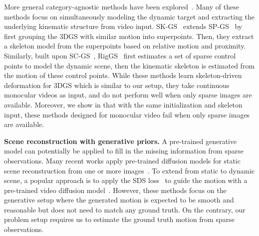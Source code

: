 More general category-agnostic methods have been explored~\cite{noguchi2022watch, yang2022banmo, zhang2024bags, wan2024template, yao2025riggs}. Many of these methods focus on simultaneously modeling the dynamic target and extracting the underlying kinematic structure from video input. 
SK-GS~\cite{wan2024template} extends SP-GS~\cite{wan2024superpoint} by first grouping the 3DGS with similar motion into superpoints. Then, they extract a skeleton model from the superpoints based on relative motion and proximity.
Similarly, built upon SC-GS~\cite{huang2024sc}, RigGS~\cite{yao2025riggs} first estimates a set of sparse control points to model the dynamic scene, then the kinematic skeleton is estimated from the motion of these control points. While these methods learn skeleton-driven deformation for 3DGS which is similar to our setup, they take continuous monocular videos as input, and do not perform well when only sparse images are available. Moreover, we show in  that with the same initialization and skeleton input, these methods designed for monocular video fail when only sparse images are available. 


\par
\vspace{6pt}
\noindent\textbf{Scene reconstruction with generative priors.}
A pre-trained generative model can potentially be applied to fill in the missing information from sparse observations.
Many recent works apply pre-trained diffusion models for static scene reconstruction from one or more images~\cite{liu2023zero, liu2024one, tang2023dreamgaussian, shi2023mvdream}. To extend from static to dynamic scene, a popular approach is to apply the SDS loss~\cite{pooledreamfusion} to guide the motion with a pre-trained video diffusion model~\cite{zhao2023animate124, li2025articulated, xu2024comp4d,bahmani20244d,ling2024align,zeng2024stag4d,zheng2024unified}. However, these methods focus on the generative setup where the generated motion is expected to be smooth and reasonable but does not need to match any ground truth. On the contrary, our problem setup requires us to estimate the ground truth motion from sparse observations. 

